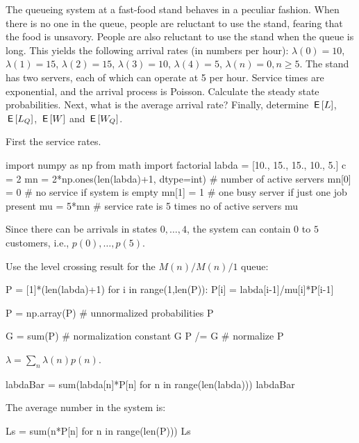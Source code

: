 \begin{extra}[Hall 5.8] The queueing system at a fast-food stand behaves in a peculiar fashion.
  When there is no one in the queue, people are reluctant to use the stand, fearing that the food is unsavory.
  People are also reluctant to use the stand when the queue is long.
  This yields the following arrival rates (in numbers per hour): $\lambda(0) = 10$, $\lambda(1)=15$, $\lambda(2)=15$, $\lambda(3)=10$, $\lambda(4)=5$, $\lambda(n)=0, n\geq 5$.
  The stand has two servers, each of which can operate at 5 per hour.
  Service times are exponential, and the arrival process is Poisson.
  Calculate the steady state probabilities.
  Next, what is the average arrival rate?
  Finally, determine $\,\mathsf{E}\left[L\right]$, $\,\mathsf{E}\left[L_Q\right]$, $\,\mathsf{E}\left[W\right]$ and $\,\mathsf{E}\left[W_Q\right]$.
  \begin{solution}
First the service rates.
\begin{pyconsole}
import numpy as np
from math import factorial
labda = [10., 15., 15., 10., 5.]
c = 2
mn = 2*np.ones(len(labda)+1, dtype=int)  # number of active servers
mn[0] = 0  # no service if system is empty
mn[1] = 1  # one busy server if just one job present
mu = 5*mn # service rate is 5 times no of active servers
mu
\end{pyconsole}

Since there can be arrivals in states $0,\ldots, 4$,  the system can contain $0$ to $5$ customers, i.e., $p(0),\ldots, p(5)$.

Use the level crossing result for the $M(n)/M(n)/1$ queue:

\begin{pyconsole}
P = [1]*(len(labda)+1)
for i in range(1,len(P)):
    P[i] = labda[i-1]/mu[i]*P[i-1]

P = np.array(P) # unnormalized probabilities
P
\end{pyconsole}

\begin{pyconsole}
G = sum(P) # normalization constant
G
P /= G # normalize
P 
\end{pyconsole} 

$\lambda = \sum_{n}\lambda(n) p(n)$.

\begin{pyconsole}
labdaBar = sum(labda[n]*P[n] for n in range(len(labda)))
labdaBar
\end{pyconsole}


The average number in the system is: 

\begin{pyconsole}
Ls = sum(n*P[n] for n in range(len(P)))
Ls
\end{pyconsole}



\end{solution}
\end{extra}
